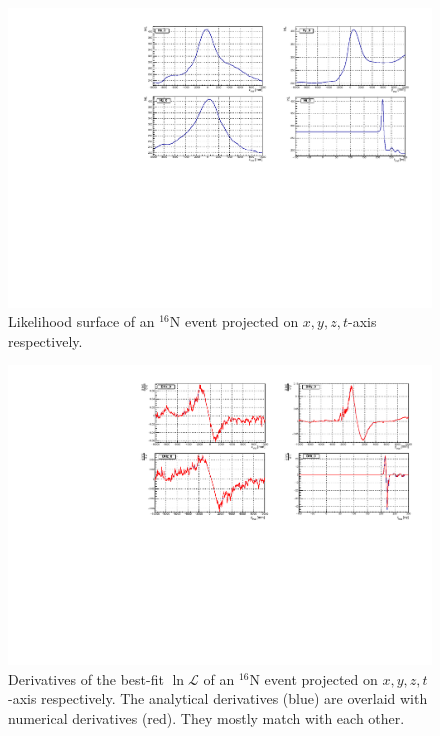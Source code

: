 \begin{figure}
	\centering
	\includegraphics[width=160mm]{logL_xyzt.pdf}
	\caption{Likelihood surface of an {$^{16}$}N event projected on $x, y, z, t$-axis respectively.\label{logLxyz}}
\end{figure}

\begin{figure}
	\centering
	\includegraphics[width=160mm]{derivativeLogL_xyzt.pdf}
	\caption[Derivatives of the best-fit $\ln \mathcal{L}$ of an {$^{16}$}N event projected on $x, y, z, t$-axis respectively.]{Derivatives of the best-fit $\ln \mathcal{L}$ of an {$^{16}$}N event projected on $x, y, z, t$-axis respectively. The analytical derivatives (blue) are overlaid with numerical derivatives (red). They mostly match with each other.\label{derivative_logLxyz}}
\end{figure}

